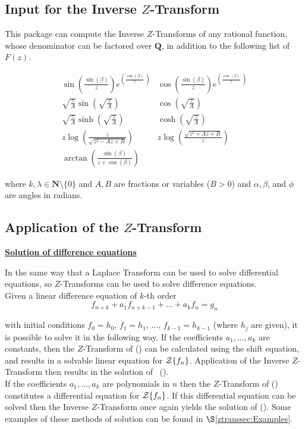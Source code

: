 \subsection[Input for the Inverse Z-Transform]{Input for the Inverse $Z$-Transform}

This package can compute the Inverse $Z$-Transforms of any rational
function, whose denominator can be factored over $\mathbf{Q}$, in
addition to the following list of $F(z)$.

{\setlength{\arraycolsep}{1cm}
\[
\renewcommand{\arraystretch}{2}
\begin{array}{cc}
  \sin \left(\frac{\sin (\beta)}{z} \right) e^{\left(\frac{\cos (\beta)}{z} \ \right)}
  & \cos \left(\frac{\sin (\beta)}{z} \right) e^{\left(\frac{\cos (\beta)}{z} \ \right)} \\
  \sqrt{\frac{z}{A}} \sin \left( \sqrt{\frac{z}{A}} \right)
  & \cos \left( \sqrt{\frac{z}{A}} \right) \\
  \sqrt{\frac{z}{A}} \sinh \left( \sqrt{\frac{z}{A}} \right)
  & \cosh \left( \sqrt{\frac{z}{A}} \right) \\
  z \log \left(\frac{z}{\sqrt{z^2-A z+B}} \right)
  & z \log \left(\frac{\sqrt{z^2+A z+B}}{z} \right) \\
  \arctan \left(\frac{\sin (\beta)}{z+\cos (\beta)} \right)
\end{array}
\]}

where $k,\lambda \in \mathbf{N} \setminus \{0\}$ and $A,B$ are fractions or
variables ($B>0$) and $\alpha,\beta$, and $\phi$ are angles in
radians.

\subsection[Application of the Z-Transform]{Application of the $Z$-Transform}
\underline {\textbf{Solution of difference equations}}

  In the same way that a Laplace Transform can be used to
  solve differential equations, so $Z$-Transforms can be used
  to solve difference equations.\\
  Given a linear difference equation of $k$-th order
\begin{equation}
  f_{n+k} + a_1 f_{n+k-1}+ \ldots + a_k f_n = g_n
\label{eq:1}
\end{equation}

  with initial conditions
  $f_0 = h_0$, $f_1 = h_1$, $\ldots$, $f_{k-1} = h_{k-1}$ (where $h_j$
  are given), it is possible to solve it in the following way.
   If the coefficients $a_1, \ldots , a_k$ are constants, then the
  $Z$-Transform of () can be calculated using the shift
  equation, and results in a solvable linear equation for
  ${\cal Z} \{f_n\}$. Application of the Inverse $Z$-Transform
  then results in the solution of \ ().\\
  If the coefficients $a_1, \ldots , a_k$ are polynomials in $n$ then
  the $Z$-Transform of () constitutes a differential
  equation for ${\cal Z} \{f_n\}$. If this differential equation can
  be solved then the Inverse $Z$-Transform once again yields the
  solution of ().
  Some examples of these methods of solution can be found in
  $\S$\ref{ztranssec:Examples}.

